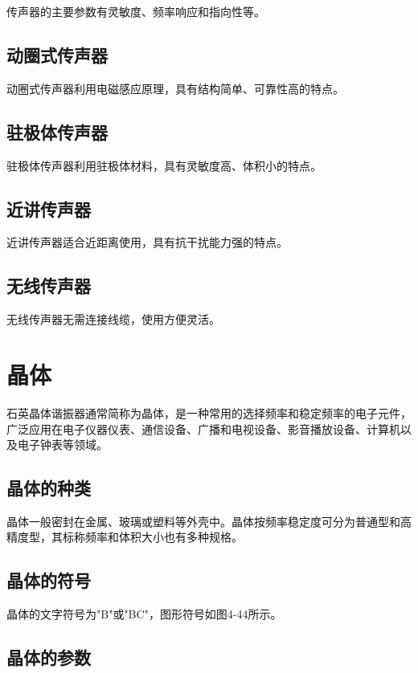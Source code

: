 \documentclass[12pt,UTF8]{ctexbook}
\begin{document}
传声器的主要参数有灵敏度、频率响应和指向性等。

\subsection{动圈式传声器}

动圈式传声器利用电磁感应原理，具有结构简单、可靠性高的特点。

\subsection{驻极体传声器}

驻极体传声器利用驻极体材料，具有灵敏度高、体积小的特点。

\subsection{近讲传声器}

近讲传声器适合近距离使用，具有抗干扰能力强的特点。

\subsection{无线传声器}

无线传声器无需连接线缆，使用方便灵活。

\section{晶体}

石英晶体谐振器通常简称为晶体，是一种常用的选择频率和稳定频率的电子元件，广泛应用在电子仪器仪表、通信设备、广播和电视设备、影音播放设备、计算机以及电子钟表等领域。

\subsection{晶体的种类}

晶体一般密封在金属、玻璃或塑料等外壳中。晶体按频率稳定度可分为普通型和高精度型，其标称频率和体积大小也有多种规格。

\subsection{晶体的符号}

晶体的文字符号为"B"或"BC"，图形符号如图4-44所示。

\subsection{晶体的参数}
\end{document}
